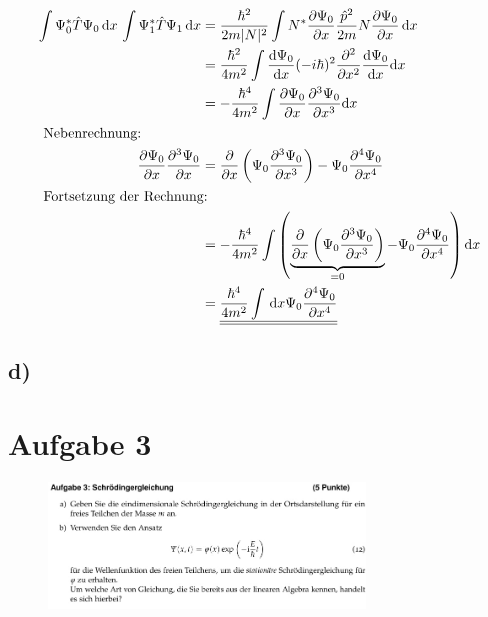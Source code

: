 \begin{align}
    \int \Psi _0^* \hat T \Psi _0 \,\mathrm{d}x\,\int \Psi _1^* \hat T \Psi _1 \, \mathrm{d}x&= \frac{\hbar ^2}{2m\lvert N\rvert^2} \int N^* \frac{\partial \Psi _0}{\partial x} \frac{\hat p ^2}{2m} N \frac{\partial \Psi _0}{\partial x} \,\mathrm{d}x\\
    &= \frac{\hbar ^2}{4m^2} \int \frac{\mathrm{d} \Psi _0}{\mathrm{d} x} (-i \hbar)^2 \frac{\partial ^2}{\partial x^2}\frac{\mathrm{d} \Psi _0}{\mathrm{d} x} \mathrm{d} x\\
    &= -\frac{\hbar ^4}{4m^2} \int \frac{\partial \Psi _0}{\partial x} \frac{\partial ^3 \Psi _0}{\partial x^3} \mathrm{d}x\\
    \intertext{
        Nebenrechnung:
    }
    \frac{\partial \Psi _0}{\partial x}\frac{\partial ^3 \Psi _0}{\partial x}&=\frac{\partial}{\partial x}\left(\Psi _0 \frac{\partial ^3 \Psi _0}{\partial x^3} \right)-\Psi _0 \frac{\partial ^4 \Psi _0}{\partial x^4}\\
    \intertext{
        Fortsetzung der Rechnung:
    }
    &=-\frac{\hbar ^4}{4m^2} \int \left(\underbrace{ \frac{\partial}{\partial x}\left(\Psi _0 \frac{\partial ^3 \Psi _0}{\partial x^3}\right)}_{=0} -\Psi _0 \frac{\partial ^4 \Psi _0}{\partial x^4}  \right) \mathrm{d}x\\
    &= \underline{\underline{\frac{\hbar ^4}{4m^2} \int\,\mathrm{d}x \Psi _0 \frac{\partial ^4\Psi _0}{\partial x^4}  }}
\end{align}


\subsection{d)}




\section{Aufgabe 3}

\begin{figure}[H]
    \centering
    \includegraphics[width=0.75\textwidth]{images/Aufgabe_3ab.jpg}
    \label{fig:3}
\end{figure}

